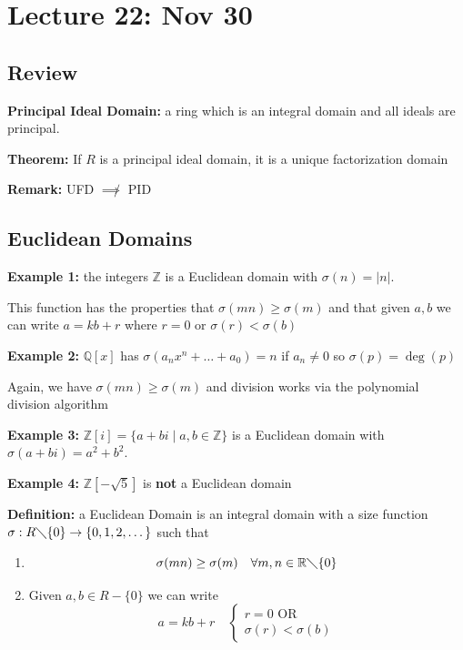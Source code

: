 \documentclass[12pt]{report}
\newcommand{\R}{\mathbb{R}}
\newcommand{\Z}{\mathbb{Z}}
\newcommand{\Q}{\mathbb{Q}}
\newcommand{\abs}[1]{\left\vert #1 \right\vert}
\begin{document}
\section*{Lecture 22: Nov 30} 
    \subsection*{Review}
        \textbf{Principal Ideal Domain:} a ring which is an integral domain and all ideals are principal.

        \textbf{Theorem:} If $R$ is a principal ideal domain, it is a unique factorization domain 
        
        \textbf{Remark:} UFD $\not \implies$ PID

    \subsection*{Euclidean Domains}
        \textbf{Example 1:} the integers $\Z$ is a Euclidean domain with $\sigma(n) = \abs n$. 
    
        This function has the properties that $\sigma(mn) \geq \sigma(m)$ and that given $a, b$ we can write $a = kb + r$ where $r = 0$ or $\sigma(r) < \sigma(b)$

        \textbf{Example 2:} $\Q[x]$ has $\sigma(a_n x^n + \dots + a_0) = n$ if $a_n \neq 0$ so $\sigma(p) = \deg(p)$ 

        Again, we have $\sigma(mn) \geq \sigma(m)$ and division works via the polynomial division algorithm 

        \textbf{Example 3:} $\Z[i] = \{a + bi \; | \; a, b \in \Z\}$ is a Euclidean domain with $\sigma(a + bi) = a^2 + b^2$.

        \textbf{Example 4:} $\Z[-\sqrt 5]$ is \textbf{not} a Euclidean domain 
        
        \textbf{Definition:} a Euclidean Domain is an integral domain with a size function $\sigma: R \diagdown \{0\} \to \{0, 1, 2, \dots\}$ such that
        \begin{enumerate}
            \item 
            \[\sigma(mn) \geq \sigma(m) \quad \forall m,n \in \R \diagdown \{0\}\]
            \item Given $a, b \in R - \{0\}$ we can write 
            \[a = kb + r \quad \begin{cases}
                r = 0 \text{ OR}\\
                \sigma(r) < \sigma(b)
            \end{cases}\]
        \end{enumerate}
\end{document}

